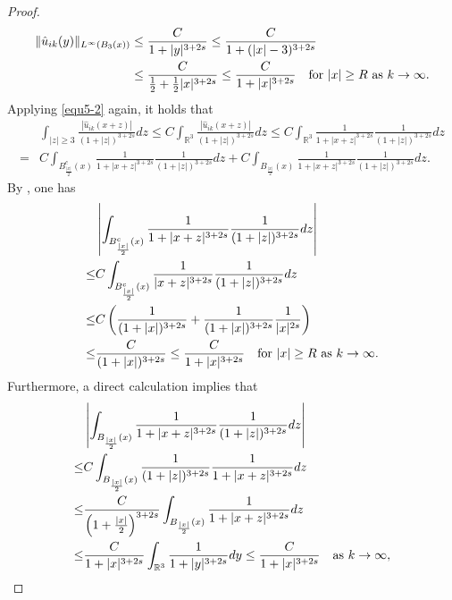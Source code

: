 \documentclass[reqno, 11pt]{amsart} %
\numberwithin{equation}{section}
\begin{document}
\begin{proof}
\begin{equation}
\begin{split}
				\|\hat{u}_{ik}(y)\|_{L^{\infty}(B_{3}(x))}&\leq\frac{C}{1+|y|^{3+2s}}\leq\frac{C}{1+(|x|-3)^{3+2s}}\\
				&\leq\frac{C}{\frac{1}{2}+\frac{1}{2}|x|^{3+2s}}\leq\frac{C}{1+|x|^{3+2s}}\quad \hbox{for $|x|\geq R$ as $k\rightarrow\infty$}.
			\end{split}
		\end{equation}
		Applying \eqref{equ5-2} again, it holds that
		\begin{equation}\label{equ5-5}
			\begin{split}
				&	\int_{|z|\geq3}\frac{|\hat{u}_{ik}(x+z)|}{(1+|z|)^{3+2s}}dz\leq C\int_{\mathbb{R}^{3}}\frac{|\hat{u}_{ik}(x+z)|}{(1+|z|)^{3+2s}}dz
				\leq C\int_{\mathbb{R}^{3}}\frac{1}{1+|x+z|^{3+2s}}\frac{1}{(1+|z|)^{3+2s}}dz\\
				=&C\int_{B^{c}_{\frac{|x|}{2}}(x)}\frac{1}{1+|x+z|^{3+2s}}\frac{1}{(1+|z|)^{3+2s}}dz+C\int_{B_{\frac{|x|}{2}}(x)}\frac{1}{1+|x+z|^{3+2s}}\frac{1}{(1+|z|)^{3+2s}}dz.
			\end{split}
		\end{equation}
		By \cite[Lemma A.3]{GYX}, one has
		\begin{equation}\label{equ5-6}
			\begin{split}
				&	\left| \int_{B^{c}_{\frac{|x|}{2}}(x)}\frac{1}{1+|x+z|^{3+2s}}\frac{1}{(1+|z|)^{3+2s}}dz\right| \\
				\leq& C\int_{B^{c}_{\frac{|x|}{2}}(x)}\frac{1}{|x+z|^{3+2s}}\frac{1}{(1+|z|)^{3+2s}}dz\\
				\leq& C\left( \frac{1}{(1+|x|)^{3+2s}}+\frac{1}{(1+|x|)^{3+2s}}\frac{1}{|x|^{2s}}\right)\\
				\leq&\frac{C}{(1+|x|)^{3+2s}}\leq\frac{C}{1+|x|^{3+2s}}\quad \hbox{for $|x|\geq R$ as $k\rightarrow\infty$}.
			\end{split}
		\end{equation}
		Furthermore, a direct calculation implies that		
		\begin{equation}\label{equ5-7}
			\begin{split}
				&	\left| \int_{B_{\frac{|x|}{2}}(x)}\frac{1}{1+|x+z|^{3+2s}}\frac{1}{(1+|z|)^{3+2s}}dz\right| \\
				\leq& C\int_{B_{\frac{|x|}{2}}(x)}\frac{1}{(1+|z|)^{3+2s}}\frac{1}{1+|x+z|^{3+2s}}dz\\
				\leq&\frac{C}{\left( 1+\frac{|x|}{2}\right)^{3+2s} }\int_{B_{\frac{|x|}{2}}(x)}\frac{1}{1+|x+z|^{3+2s}}dz\\
				\leq&\frac{C}{1+|x|^{3+2s}}\int_{\mathbb{R}^{3}}\frac{1}{1+|y|^{3+2s}}dy\leq\frac{C}{1+|x|^{3+2s}}\quad \hbox{as $k\rightarrow\infty$},

\end{split}
\end{equation}
\end{proof}
\end{document}
